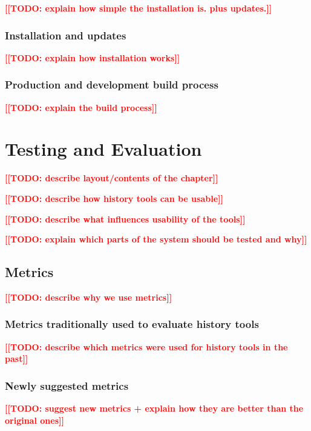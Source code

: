 \documentclass[thesis=M,english]{FITthesis}[2012/10/20]
\newcommand{\blind}[1][1]{}
\newcommand{\todotext}[1]{\textcolor{red}{\textbf{[[#1]]}}}
\begin{document}
\todotext{TODO: explain how simple the installation is. plus updates.}

\blind

\subsection{Installation and updates}
\todotext{TODO: explain how installation works}

\blind

\subsection{Production and development build process}
\todotext{TODO: explain the build process}

\blind[2]


\chapter{Testing and Evaluation}

\todotext{TODO: describe layout/contents of the chapter}

\todotext{TODO: describe how history tools can be usable}

\todotext{TODO: describe what influences usability of the tools}

\todotext{TODO: explain which parts of the system should be tested and why}

\blind[3]

\section{Metrics}

\todotext{TODO: describe why we use metrics}

\subsection{Metrics traditionally used to evaluate history tools}

\todotext{TODO: describe which metrics were used for history tools in the past}

\subsection{Newly suggested metrics}

\todotext{TODO: suggest new metrics + explain how they are better than the original ones}
\end{document}
